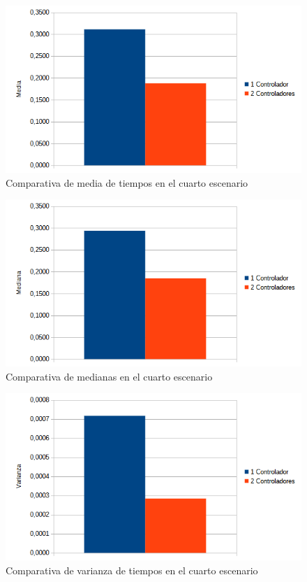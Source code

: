 \documentclass[a4paper, 12pt]{book}
\begin{document}
	\begin{figure}[H]
		\centering
		\includegraphics[width=16cm, keepaspectratio]{img/comparativamediaescenario4}
		\caption{Comparativa de media de tiempos en el cuarto escenario}
		\label{figura:mediaescenario4}
	\end{figure}
	
	\begin{figure}[H]
		\centering
		\includegraphics[width=12cm, keepaspectratio]{img/comparativamedianaescenario4}
		\caption{Comparativa de medianas en el cuarto escenario}
		\label{figura:medianae4}
	\end{figure}
	
	\begin{figure}[H]
		\centering
		\includegraphics[width=12cm, keepaspectratio]{img/comparativavarianzaescenario4}
		\caption{Comparativa de varianza de tiempos en el cuarto escenario}
		\label{figura:varianzae4}
	\end{figure}
	
\end{document}
